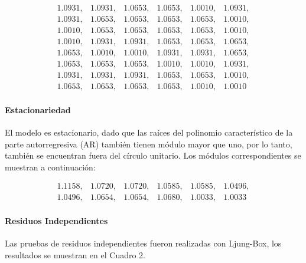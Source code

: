 \documentclass[12pt,letterpaper]{article}   %
\begin{document}
\[
\begin{array}{cccccc}
1.0931, & 1.0931, & 1.0653, & 1.0653, & 1.0010, & 1.0931, \\
1.0931, & 1.0653, & 1.0653, & 1.0653, & 1.0653, & 1.0010, \\
1.0010, & 1.0653, & 1.0653, & 1.0653, & 1.0653, & 1.0010, \\
1.0010, & 1.0931, & 1.0931, & 1.0653, & 1.0653, & 1.0653, \\
1.0653, & 1.0010, & 1.0010, & 1.0931, & 1.0931, & 1.0653, \\
1.0653, & 1.0653, & 1.0653, & 1.0010, & 1.0010, & 1.0931, \\
1.0931, & 1.0931, & 1.0931, & 1.0653, & 1.0653, & 1.0010, \\
1.0653, & 1.0653, & 1.0653, & 1.0653, & 1.0010, & 1.0010
\end{array}
\]

\paragraph{Estacionariedad}  
El modelo es estacionario, dado que las raíces del polinomio característico de la parte autorregresiva (AR) también tienen módulo mayor que uno, por lo tanto, también se encuentran fuera del círculo unitario. Los módulos correspondientes se muestran a continuación:

\[
\begin{array}{cccccc}
1.1158, & 1.0720, & 1.0720, & 1.0585, & 1.0585, & 1.0496, \\
1.0496, & 1.0654, & 1.0654, & 1.0680, & 1.0033, & 1.0033
\end{array}
\]



\paragraph{Residuos Independientes}
Las pruebas de residuos independientes fueron realizadas con Ljung-Box, los resultados se muestran en el Cuadro 2.
\end{document}
